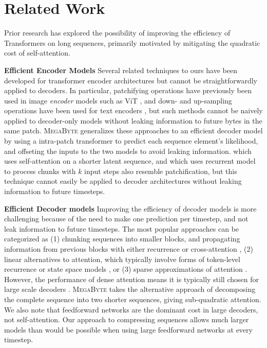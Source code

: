 \documentclass{article}
\newcommand{\fastslow}[0]{\textsc{MegaByte}\xspace}
\newcommand{\megabyte}[0]{\fastslow}
\theoremstyle{plain}
\theoremstyle{definition}
\theoremstyle{remark}
\begin{document}
\section{Related Work}
\label{sec:related}
Prior research has explored the possibility of improving the efficiency of Transformers on long sequences, primarily motivated by mitigating the quadratic cost of self-attention.

\textbf{Efficient Encoder Models} Several related techniques to ours have been developed for transformer encoder architectures but cannot be straightforwardly applied to decoders. In particular, patchifying operations have previously been used in image \emph{encoder} models such as ViT \citep{vit}, and down- and up-sampling operations have been used for text encoders \citep{canine}, but such methods cannot be naively applied to decoder-only models without leaking information to future bytes in the same patch. \megabyte generalizes these approaches to an efficient decoder model by using a intra-patch transformer to predict each sequence element's likelihood, and offseting the inputs to the two models to avoid leaking information. \citet{perceiver} which uses self-attention on a shorter latent sequence, and \citet{temporalbottleneck} which uses recurrent model to process chunks with $k$ input steps also resemble patchification, but this technique cannot easily be applied to decoder architectures without leaking information to future timesteps.

\textbf{Efficient Decoder models} Improving the efficiency of decoder models is more challenging because of the need to make one prediction per timestep, and not leak information to future timesteps. The most popular approaches can be categorized as (1) chunking sequences into smaller blocks, and propagating information from previous blocks with either recurrence \citep{xfmxl,blockrecurrent} or cross-attention \citep{perceiverar}, (2) linear alternatives to attention, which typically involve forms of token-level recurrence \citep{lineartransformer, linear} or state space models \citep{s4,s5,mega}, or (3) sparse approximations of attention \citep{reformer,longformer,sparsetransformer,memorizing}. However, the performance of dense attention means it is typically still chosen for large scale decoders \citep{llama,palm}. \megabyte takes the alternative approach of decomposing the complete sequence into two shorter sequences, giving sub-quadratic attention. We also note that feedforward networks are the dominant cost in large decoders, not self-attention. Our approach to compressing sequences allows much larger models than would be possible when using large feedforward networks at every timestep.
\end{document}
